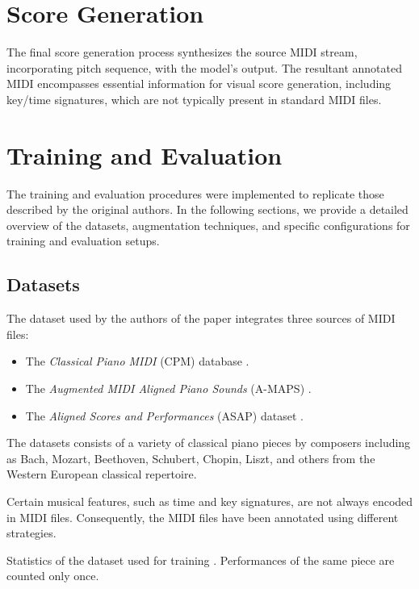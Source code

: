 \section{Score Generation}

The final score generation process synthesizes the source MIDI stream, incorporating pitch sequence, with the model's output. The resultant annotated MIDI encompasses essential information for visual score generation, including key/time signatures, which are not typically present in standard MIDI files.

\section{Training and Evaluation}

The training and evaluation procedures were implemented to replicate those described by the original authors. In the following sections, we provide a detailed overview of the datasets, augmentation techniques, and specific configurations for training and evaluation setups.

\subsection{Datasets}\label{datasets}

The dataset used by the authors of the paper \cite{Liu2022} integrates three sources of MIDI files: \begin{itemize}
	\item The \emph{Classical Piano MIDI} (CPM) database \cite{Krueger1996}.
	\item The \emph{Augmented MIDI Aligned Piano Sounds} (A-MAPS) \cite{Ycart2018}.
	\item The \emph{Aligned Scores and Performances} (ASAP) dataset \cite{Foscarin2020}.
\end{itemize}

The datasets consists of a variety of classical piano pieces by composers including as Bach, Mozart, Beethoven, Schubert, Chopin, Liszt, and others from the Western European classical repertoire.

Certain musical features, such as time and key signatures, are not always encoded in MIDI files. Consequently, the MIDI files have been annotated using different strategies.

\begin{table}[ht!]
\centering

\caption[Statistics of the dataset used for training.]{Statistics of the dataset used for training \cite{Liu2022}. Performances of the same piece are counted only once.}
\label{train_valid_test}
\end{table}

